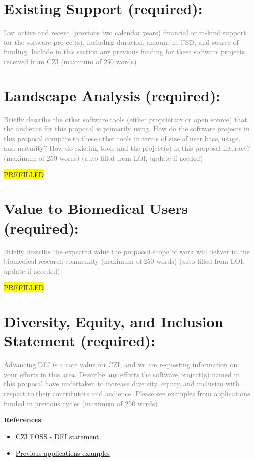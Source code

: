 \section{Existing Support (required):}
\textcolor{gray}{List active and recent (previous two calendar years) financial or in-kind support for the software project(s), including duration, amount in USD, and source of funding. Include in this section any previous funding for these software projects received from CZI (maximum of 250 words)}

\section{Landscape Analysis (required):}
\textcolor{gray}{Briefly describe the other software tools (either proprietary or open source) that the audience for this proposal is primarily using. How do the software projects in this proposal compare to these other tools in terms of size of user base, usage, and maturity? How do existing tools and the project(s) in this proposal interact? (maximum of 250 words) (auto-filled from LOI; update if needed)}

\hl{PREFILLED}  

\section{Value to Biomedical Users (required):}
\textcolor{gray}{Briefly describe the expected value the proposed scope of work will deliver to the biomedical research community (maximum of 250 words) (auto-filled from LOI; update if neeeded) }

\hl{PREFILLED}  

\section{Diversity, Equity, and Inclusion Statement (required):}
\textcolor{gray}{Advancing DEI is a core value for CZI, and we are requesting information on your efforts in this area. Describe any efforts the software project(s) named in this proposal have undertaken to increase diversity, equity, and inclusion with respect to their contributors and audience. Please see examples from applications funded in previous cycles (maximum of 250 words) }

\textbf{References}:
\begin{itemize}
\item \href{https://chanzuckerberg.com/about/our-approach/dei/}{CZI EOSS - DEI statement}
\item \href{https://apply.chanzuckerberg.com/protected/resource/eyJoZnJlIjogOTQ1ODEyNDksICJ2cSI6IDEzOTQ5OH0/}{Previous applications examples}
\end{itemize}